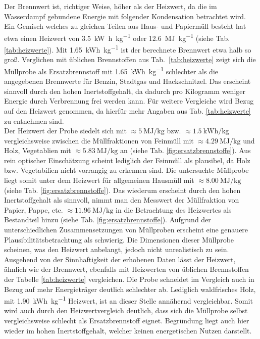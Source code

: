 Der Brennwert ist, richtiger Weise, höher als der Heizwert, da die im Wasserdampf gebundene Energie mit folgender Kondensation betrachtet wird. Ein Gemisch  welches zu gleichen Teilen aus Haus- und Papiermüll besteht hat etwa einen Heizwert von \SI{3,5}{\kilo\watt\hour\per\kilogram} oder \SI{12,6}{\mega\joule\per\kilogram} (siehe Tab. \ref{tab:heizwerte}). Mit \SI{1,65}{\kWh\per\kg} ist der berechnete Brennwert etwa halb so groß. Verglichen mit üblichen Brennstoffen aus \mbox{Tab. \ref{tab:heizwerte}} zeigt sich die Müllprobe als Ersatzbrennstoff mit \SI{1,65}{\kWh\per\kg} schlechter als die angegebenen Brennwerte für Benzin, Stadtgas und Hackschnitzel. Das erscheint sinnvoll durch den hohen Inertstoffgehalt, da dadurch pro Kilogramm weniger Energie durch Verbrennung frei werden kann. Für weitere Vergleiche wird Bezug auf den Heizwert genommen, da hierfür mehr Angaben aus Tab. \ref{tab:heizwerte} zu entnehmen sind.\\ 
Der Heizwert der Probe siedelt sich mit $\approx \SI{5}{\mega \joule \per \kg}$ bzw. $\approx \SI{1,5}{\kWh\per\kg}$ vergleichsweise zwischen die Müllfraktionen von Feinmüll mit $\approx \SI{4,29}{\mega \joule \per \kg}$ und Holz, Vegetablien mit $\approx \SI{5,83}{\mega \joule \per \kg}$ an (siehe Tab. \ref{fig:ersatzbrennstoffe}). Aus rein optischer Einschätzung scheint lediglich der Feinmüll als plausibel, da Holz bzw. Vegetabilien nicht vorrangig zu erkennen sind. Die untersuchte Müllprobe liegt somit unter dem Heizwert für allgemeinen Hausmüll mit $\approx \SI{8,00}{\mega \joule \per \kg}$ (siehe Tab. \ref{fig:ersatzbrennstoffe}). Das wiederum erscheint durch den hohen Inertstoffgehalt als sinnvoll, nimmt man den Messwert der Müllfraktion von Papier, Pappe, etc. $\approx \SI{11,96}{\mega \joule \per \kg}$ in die Betrachtung des Heizwertes als Bestandteil hinzu (siehe Tab. \ref{fig:ersatzbrennstoffe}). Aufgrund der unterschiedlichen Zusammensetzungen von Müllproben erscheint eine genauere Plausibilitätsbetrachtung als schwierig. Die Dimensionen dieser Müllprobe scheinen, was den Heizwert anbelangt, jedoch nicht unrealistisch zu sein.\\
Ausgehend von der Sinnhaftigkeit der erhobenen Daten lässt der Heizwert, ähnlich wie der Brennwert, ebenfalls mit Heizwerten von üblichen Brennstoffen der Tabelle \ref{tab:heizwerte} vergleichen. Die Probe schneidet im Vergleich auch in Bezug auf mehr Energieträger deutlich schlechter ab. Lediglich waldfrisches Holz, mit \SI{1,90}{\kWh\per\kg} Heizwert, ist an dieser Stelle annähernd vergleichbar. Somit wird auch durch den Heizwertvergleich deutlich, dass sich die Müllprobe selbst vergleichsweise schlecht als Ersatzbrennstoff eignet. Begründung liegt auch hier wieder im hohen Inertstoffgehalt, welcher keinen energetischen Nutzen darstellt.\\ \\
